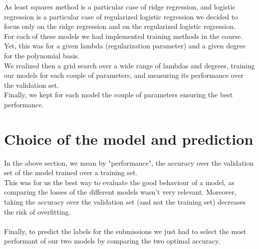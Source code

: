 \documentclass[a4paper, 10pt]{article}
\begin{document}
		As least squares method is a particular case of ridge regression, and logistic regression is a particular case of regularized logistic regression we decided to focus only on the ridge regression and on the regularized logistic regression. 
		\\ For each of these models we had implemented training methods in the course. Yet, this was for a given lambda (regularization parameter) and a given degree for the polynomial basis.
		\\ We realized then a grid search over a wide range of lambdas and degrees, training our models for each couple of parameters, and measuring its performance over the validation set. 
		\\ Finally, we kept for each model the couple of parameters ensuring the best performance. 
		
	\section{Choice of the model and prediction}	

		In the above section, we mean by "performance", the accuracy over the validation set of the model trained over a training set. 
		\\ This was for us the best way to evaluate the good behaviour of a model, as comparing the losses of the different models wasn't very relevant. Moreover, taking the accuracy over the validation set (and not the training set) decreases the risk of overfitting.
		\\
		\\Finally, to predict the labels for the submissions we just had to select the most performant of our two models by comparing the two optimal accuracy.   
\end{document}

